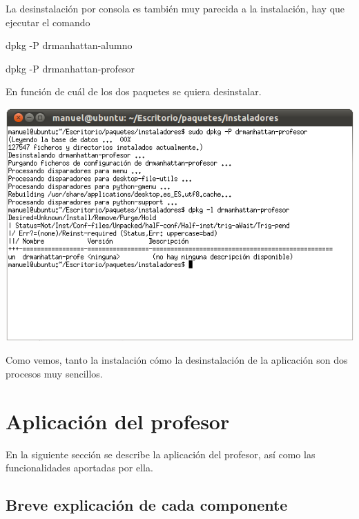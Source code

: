 \documentclass[11pt]{article}
\begin{document}
La desinstalación por consola es también muy parecida a la instalación, hay que ejecutar el comando

\begin{center}
    dpkg -P drmanhattan-alumno

    dpkg -P drmanhattan-profesor
\end{center}

En función de cuál de los dos paquetes se quiera desinstalar.

\begin{center}

    \includegraphics[width=.90\linewidth]{imagenes/desConsola}

\end{center}

Como vemos, tanto la instalación cómo la desinstalación de la aplicación son dos procesos muy sencillos.


\newpage
\section{Aplicación del profesor}

En la siguiente sección se describe la aplicación del profesor, así como las funcionalidades aportadas por ella.

\subsection{Breve explicación de cada componente}
\end{document}
